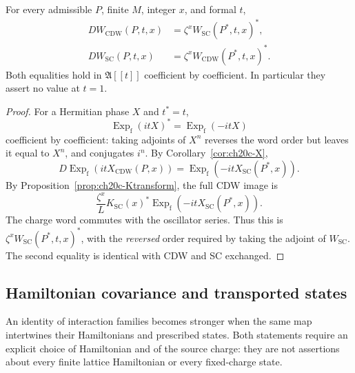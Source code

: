 \begin{theorem}
\label{thm:ch20c-Wdual}
For every admissible $P$, finite $M$, integer $x$, and formal $t$,
\begin{align}
 D W_{\mathrm{CDW}}(P,t,x)
 &=\zeta^xW_{\mathrm{SC}}(P^*,t,x)^*,\nonumber\\
 D W_{\mathrm{SC}}(P,t,x)
 &=\zeta^xW_{\mathrm{CDW}}(P^*,t,x)^*.
 \label{eq:ch20c-vertex-duality}
\end{align}
Both equalities hold in $\mathfrak A[[t]]$ coefficient by
coefficient.  In particular they assert no value at $t=1$.
\end{theorem}
\begin{proof}
For a Hermitian phase $X$ and $t^*=t$,
\[
 \operatorname{Exp}_{\mathrm f}(itX)^*
 =\operatorname{Exp}_{\mathrm f}(-itX)
\]
coefficient by coefficient: taking adjoints of $X^n$ reverses the
word order but leaves it equal to $X^n$, and conjugates $i^n$.
By Corollary~\ref{cor:ch20c-X},
\[
 D\operatorname{Exp}_{\mathrm f}
       (itX_{\mathrm{CDW}}(P,x))
 =\operatorname{Exp}_{\mathrm f}
       (-itX_{\mathrm{SC}}(P^*,x)).
\]
By Proposition~\ref{prop:ch20c-Ktransform}, the full CDW image is
\[
 \frac{\zeta^x}{L} K_{\mathrm{SC}}(x)^*
 \operatorname{Exp}_{\mathrm f}
       (-itX_{\mathrm{SC}}(P^*,x)).
\]
The charge word commutes with the oscillator series.  Thus this is
$\zeta^xW_{\mathrm{SC}}(P^*,t,x)^*$, with the \emph{reversed}
order required by taking the adjoint of $W_{\mathrm{SC}}$.
The second equality is identical with CDW and SC exchanged.
\end{proof}

\subsection{Hamiltonian covariance and transported states}
\label{subsec:ch20c-Hstate}

An identity of interaction families becomes stronger when the same
map intertwines their Hamiltonians and prescribed states.  Both
statements require an explicit choice of Hamiltonian and of the
source charge: they are not assertions about every finite lattice
Hamiltonian or every fixed-charge state.


